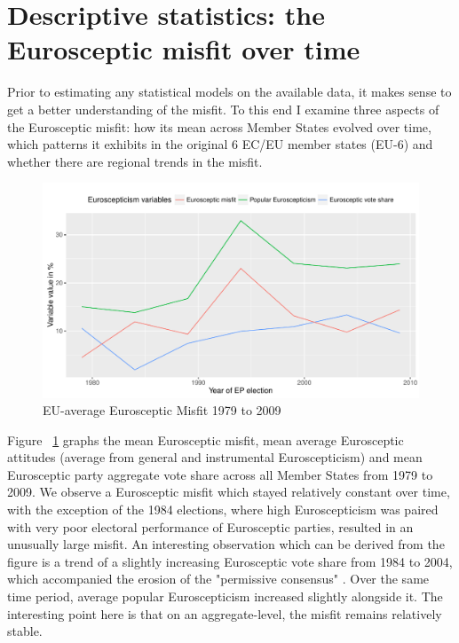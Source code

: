 \section{Descriptive statistics: the Eurosceptic misfit over time}
Prior to estimating any statistical models on the available data, it makes sense to get a better understanding of the misfit. To this end I examine three aspects of the Eurosceptic misfit: how its mean across Member States evolved over time, which patterns it exhibits in the original 6 EC/EU member states (EU-6) and whether there are regional trends in the misfit. 

\begin{figure}
\centering
\includegraphics[width=1\linewidth]{../../Analysis/Graphs/DP_and_IVs_over_time}
\caption{EU-average Eurosceptic Misfit 1979 to 2009}
\label{fig:DP_and_IVs_over_time}
\end{figure}

Figure ~\ref{fig:DP_and_IVs_over_time} graphs the mean Eurosceptic misfit, mean average Eurosceptic attitudes (average from general and instrumental Euroscepticism) and mean Eurosceptic party aggregate vote share across all Member States from 1979 to 2009. We observe a Eurosceptic misfit which stayed relatively constant over time, with the exception of the 1984 elections, where high Euroscepticism was paired with very poor electoral performance of Eurosceptic parties, resulted in an unusually large misfit. An interesting observation which can be derived from the figure is a trend of a slightly increasing Eurosceptic vote share from 1984 to 2004, which accompanied the erosion of the "permissive consensus" \cite{Marks2009}. Over the same time period, average popular Euroscepticism increased slightly alongside it. The interesting point here is that on an aggregate-level, the misfit remains relatively stable.



